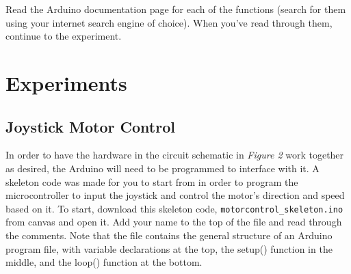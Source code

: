 \documentclass[12pt]{article}
\begin{document}
Read the Arduino documentation page for each of the functions (search for them using your internet search engine of choice). When you've read through them, continue to the experiment.

\section{Experiments}
\subsection{Joystick Motor Control}

In order to have the hardware in the circuit schematic in \textit{Figure 2} work together as desired, the Arduino will need to be programmed to interface with it. A skeleton code was made for you to start from in order to program the microcontroller to input the joystick and control the motor's direction and speed based on it. To start, download this skeleton code, \texttt{motorcontrol\_skeleton.ino} from canvas and open it. Add your name to the top of the file and read through the comments. Note that the file contains the general structure of an Arduino program file, with variable declarations at the top, the setup() function in the middle, and the loop() function at the bottom. 
\end{document}
